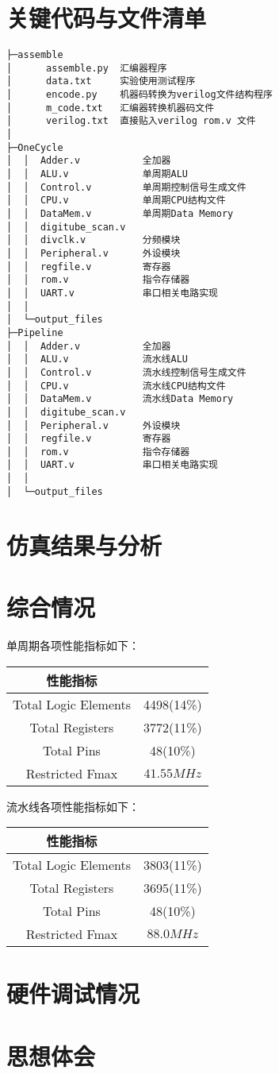 \documentclass{ctexart}
\begin{document}
	\section{关键代码与文件清单}
\begin{verbatim}
├─assemble
│      assemble.py  汇编器程序
│      data.txt		实验使用测试程序
│      encode.py	机器码转换为verilog文件结构程序
│      m_code.txt	汇编器转换机器码文件
│      verilog.txt	直接贴入verilog rom.v 文件
│
├─OneCycle
│  │  Adder.v			全加器
│  │  ALU.v				单周期ALU
│  │  Control.v			单周期控制信号生成文件
│  │  CPU.v				单周期CPU结构文件
│  │  DataMem.v			单周期Data Memory
│  │  digitube_scan.v	
│  │  divclk.v			分频模块
│  │  Peripheral.v		外设模块
│  │  regfile.v			寄存器
│  │  rom.v				指令存储器
│  │  UART.v			串口相关电路实现
│  │
│  └─output_files
├─Pipeline
│  │  Adder.v			全加器
│  │  ALU.v				流水线ALU
│  │  Control.v			流水线控制信号生成文件
│  │  CPU.v				流水线CPU结构文件
│  │  DataMem.v			流水线Data Memory
│  │  digitube_scan.v	
│  │  Peripheral.v		外设模块
│  │  regfile.v			寄存器
│  │  rom.v				指令存储器
│  │  UART.v			串口相关电路实现
│  │
│  └─output_files
\end{verbatim}
	\section{仿真结果与分析}
	\section{综合情况}
	单周期各项性能指标如下：
	\begin{center}
		\begin{tabular}{|c|c|}
		\hline
		性能指标 & \\
		\hline
		Total Logic Elements & 4498(14\%) \\
		Total Registers & 3772(11\%) \\
		Total Pins & 48(10\%) \\
		Restricted Fmax & $41.55 MHz$ \\  
		\hline
		\end{tabular}
	\end{center}
	
	流水线各项性能指标如下：
	\begin{center}
		\begin{tabular}{|c|c|}
		\hline
		性能指标 & \\
		\hline
		Total Logic Elements & 3803(11\%) \\
		Total Registers & 3695(11\%) \\
		Total Pins & 48(10\%) \\
		Restricted Fmax & $88.0 MHz$ \\  
		\hline
		\end{tabular}
	\end{center}
	\section{硬件调试情况}
	\section{思想体会}
\end{document}
